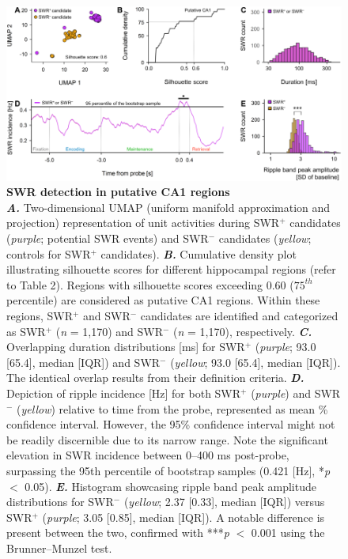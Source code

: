 \documentclass[final,3p,times,twocolumn]{elsarticle}
\begin{document}
        \clearpage
        \begin{figure}[ht]
        	\centering
            \includegraphics[width=1\textwidth]{./src/figures/.png/Figure_ID_04.png}
        	\caption{\textbf{
SWR detection in putative CA1 regions
}
\smallskip
\\
\textbf{\textit{A.}} Two-dimensional UMAP (uniform manifold approximation and projection)\cite{mcinnes_umap_2018} representation of unit activities during SWR$^+$ candidates (\textit{purple}; potential SWR events) and SWR$^-$ candidates (\textit{yellow}; controls for SWR$^+$ candidates). \textbf{\textit{B.}}  Cumulative density plot illustrating silhouette scores for different hippocampal regions (refer to Table 2). Regions with silhouette scores exceeding 0.60 ($75^{th}$ percentile) are considered as putative CA1 regions. Within these regions, SWR$^+$ and SWR$^-$ candidates are identified and categorized as SWR$^+$ (\textit{n} = 1,170) and SWR$^-$ (\textit{n} = 1,170), respectively. \textbf{\textit{C.}}  Overlapping duration distributions [ms] for SWR$^+$ (\textit{purple}; 93.0 [65.4], median [IQR]) and SWR$^-$ (\textit{yellow}; 93.0 [65.4], median [IQR]). The identical overlap results from their definition criteria. \textbf{\textit{D.}}  Depiction of ripple incidence [Hz] for both SWR$^+$ (\textit{purple}) and SWR$^-$ (\textit{yellow}) relative to time from the probe, represented as mean \% confidence interval. However, the 95\% confidence interval might not be readily discernible due to its narrow range. Note the significant elevation in SWR incidence between 0--400 ms post-probe, surpassing the 95th percentile of bootstrap samples (0.421 [Hz], *\textit{p} $<$ 0.05). \textbf{\textit{E.}}  Histogram showcasing ripple band peak amplitude distributions for SWR$^-$ (\textit{yellow}; 2.37 [0.33], median [IQR]) versus SWR$^+$ (\textit{purple}; 3.05 [0.85], median [IQR]). A notable difference is present between the two, confirmed with ***\textit{p} $<$ 0.001 using the Brunner--Munzel test.
}
        	\label{fig:04}
        \end{figure}
\end{document}
